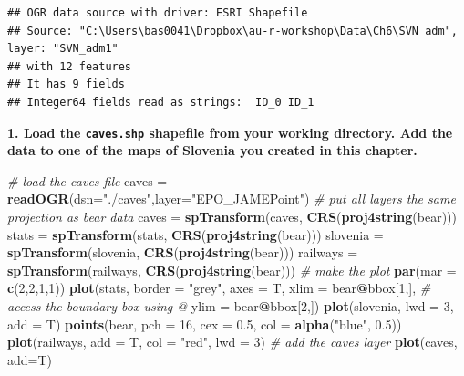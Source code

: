 \documentclass[]{book}
\newenvironment{Shaded}{\begin{snugshade}}{\end{snugshade}}
\newcommand{\KeywordTok}[1]{\textcolor[rgb]{0.13,0.29,0.53}{\textbf{#1}}}
\newcommand{\DataTypeTok}[1]{\textcolor[rgb]{0.13,0.29,0.53}{#1}}
\newcommand{\DecValTok}[1]{\textcolor[rgb]{0.00,0.00,0.81}{#1}}
\newcommand{\FloatTok}[1]{\textcolor[rgb]{0.00,0.00,0.81}{#1}}
\newcommand{\StringTok}[1]{\textcolor[rgb]{0.31,0.60,0.02}{#1}}
\newcommand{\CommentTok}[1]{\textcolor[rgb]{0.56,0.35,0.01}{\textit{#1}}}
\newcommand{\OperatorTok}[1]{\textcolor[rgb]{0.81,0.36,0.00}{\textbf{#1}}}
\newcommand{\NormalTok}[1]{#1}
\theoremstyle{definition}
\theoremstyle{definition}
\theoremstyle{definition}
\theoremstyle{remark}
\begin{document}
\begin{verbatim}
## OGR data source with driver: ESRI Shapefile 
## Source: "C:\Users\bas0041\Dropbox\au-r-workshop\Data\Ch6\SVN_adm", layer: "SVN_adm1"
## with 12 features
## It has 9 fields
## Integer64 fields read as strings:  ID_0 ID_1
\end{verbatim}

\textbf{1. Load the \texttt{caves.shp} shapefile \citep{caves-cite} from
your working directory. Add the data to one of the maps of Slovenia you
created in this chapter.}

\begin{Shaded}
\begin{Highlighting}[]
\CommentTok{# load the caves file}
\NormalTok{caves =}\StringTok{ }\KeywordTok{readOGR}\NormalTok{(}\DataTypeTok{dsn=}\StringTok{"./caves"}\NormalTok{,}\DataTypeTok{layer=}\StringTok{"EPO_JAMEPoint"}\NormalTok{)}
\CommentTok{# put all layers the same projection as bear data}
\NormalTok{caves =}\StringTok{ }\KeywordTok{spTransform}\NormalTok{(caves, }\KeywordTok{CRS}\NormalTok{(}\KeywordTok{proj4string}\NormalTok{(bear)))}
\NormalTok{stats =}\StringTok{ }\KeywordTok{spTransform}\NormalTok{(stats, }\KeywordTok{CRS}\NormalTok{(}\KeywordTok{proj4string}\NormalTok{(bear)))}
\NormalTok{slovenia =}\StringTok{ }\KeywordTok{spTransform}\NormalTok{(slovenia, }\KeywordTok{CRS}\NormalTok{(}\KeywordTok{proj4string}\NormalTok{(bear)))}
\NormalTok{railways =}\StringTok{ }\KeywordTok{spTransform}\NormalTok{(railways, }\KeywordTok{CRS}\NormalTok{(}\KeywordTok{proj4string}\NormalTok{(bear)))}
\CommentTok{# make the plot}
\KeywordTok{par}\NormalTok{(}\DataTypeTok{mar =} \KeywordTok{c}\NormalTok{(}\DecValTok{2}\NormalTok{,}\DecValTok{2}\NormalTok{,}\DecValTok{1}\NormalTok{,}\DecValTok{1}\NormalTok{))}
\KeywordTok{plot}\NormalTok{(stats, }\DataTypeTok{border =} \StringTok{"grey"}\NormalTok{, }\DataTypeTok{axes =}\NormalTok{ T,}
     \DataTypeTok{xlim =}\NormalTok{ bear}\OperatorTok{@}\NormalTok{bbox[}\DecValTok{1}\NormalTok{,],  }\CommentTok{# access the boundary box using @}
     \DataTypeTok{ylim =}\NormalTok{ bear}\OperatorTok{@}\NormalTok{bbox[}\DecValTok{2}\NormalTok{,])}
\KeywordTok{plot}\NormalTok{(slovenia, }\DataTypeTok{lwd =} \DecValTok{3}\NormalTok{, }\DataTypeTok{add =}\NormalTok{ T)}
\KeywordTok{points}\NormalTok{(bear, }\DataTypeTok{pch =} \DecValTok{16}\NormalTok{, }\DataTypeTok{cex =} \FloatTok{0.5}\NormalTok{, }\DataTypeTok{col =} \KeywordTok{alpha}\NormalTok{(}\StringTok{"blue"}\NormalTok{, }\FloatTok{0.5}\NormalTok{))}
\KeywordTok{plot}\NormalTok{(railways, }\DataTypeTok{add =}\NormalTok{ T, }\DataTypeTok{col =} \StringTok{"red"}\NormalTok{, }\DataTypeTok{lwd =} \DecValTok{3}\NormalTok{)}
\CommentTok{# add the caves layer}
\KeywordTok{plot}\NormalTok{(caves, }\DataTypeTok{add=}\NormalTok{T)}
\end{Highlighting}
\end{Shaded}
\end{document}
